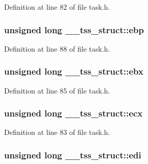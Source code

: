 Definition at line 82 of file task.\+h.

\subsubsection[{\texorpdfstring{ebp}{ebp}}]{\setlength{\rightskip}{0pt plus 5cm}unsigned long \+\_\+\+\_\+tss\+\_\+struct\+::ebp}\hypertarget{struct____tss__struct_abe00097e1842c728d70854ca727da16c}{}\label{struct____tss__struct_abe00097e1842c728d70854ca727da16c}


Definition at line 88 of file task.\+h.

\subsubsection[{\texorpdfstring{ebx}{ebx}}]{\setlength{\rightskip}{0pt plus 5cm}unsigned long \+\_\+\+\_\+tss\+\_\+struct\+::ebx}\hypertarget{struct____tss__struct_ac67f49c13b208df1720f9ca9c0da17dc}{}\label{struct____tss__struct_ac67f49c13b208df1720f9ca9c0da17dc}


Definition at line 85 of file task.\+h.

\subsubsection[{\texorpdfstring{ecx}{ecx}}]{\setlength{\rightskip}{0pt plus 5cm}unsigned long \+\_\+\+\_\+tss\+\_\+struct\+::ecx}\hypertarget{struct____tss__struct_ab0e3aa7395c5639c49855a2dd5cc2be0}{}\label{struct____tss__struct_ab0e3aa7395c5639c49855a2dd5cc2be0}


Definition at line 83 of file task.\+h.

\subsubsection[{\texorpdfstring{edi}{edi}}]{\setlength{\rightskip}{0pt plus 5cm}unsigned long \+\_\+\+\_\+tss\+\_\+struct\+::edi}\hypertarget{struct____tss__struct_a3f7cde8faad6aa59cd3b36bf8493a315}{}\label{struct____tss__struct_a3f7cde8faad6aa59cd3b36bf8493a315}


